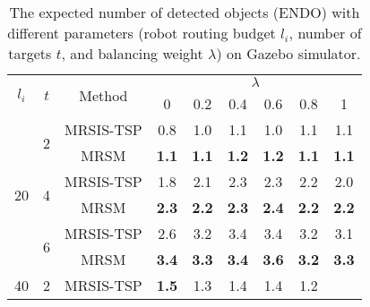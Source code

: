 \begin{table}[]
\centering
\caption{The expected number of detected objects (ENDO) with different parameters (robot routing budget $l_i$, number of targets $t$, and balancing weight $\lambda$) on Gazebo simulator.}
\label{tab:ANDO-lambda}
\begin{tabular}{|c|c|c|cccccc|}
\hline
\multirow{2}{*}{$l_i$} &
  \multirow{2}{*}{$t$} &
  \multirow{2}{*}{Method} &
  \multicolumn{6}{c|}{$\lambda$} \\ \cline{4-9}
 &
   &
   &
  \multicolumn{1}{c|}{0} &
  \multicolumn{1}{c|}{0.2} &
  \multicolumn{1}{c|}{0.4} &
  \multicolumn{1}{c|}{0.6} &
  \multicolumn{1}{c|}{0.8} &
  1 \\ \hline\hline
\multirow{6}{*}{20} &
  \multirow{2}{*}{2} &
  MRSIS-TSP\cite{li2024mrsis} &
  \multicolumn{1}{c|}{0.8} &
  \multicolumn{1}{c|}{1.0} &
  \multicolumn{1}{c|}{1.1} &
  \multicolumn{1}{c|}{1.0} &
  \multicolumn{1}{c|}{1.1} &
  1.1 \\ \cline{3-9}
 &
   &
  MRSM &
  \multicolumn{1}{c|}{\textbf{1.1}} &
  \multicolumn{1}{c|}{\textbf{1.1}} &
  \multicolumn{1}{c|}{\textbf{1.2}} &
  \multicolumn{1}{c|}{\textbf{1.2}} &
  \multicolumn{1}{c|}{\textbf{1.1}} &
  \textbf{1.1} \\ \cline{2-9}
 &
  \multirow{2}{*}{4} &
  MRSIS-TSP\cite{li2024mrsis} &
  \multicolumn{1}{c|}{1.8} &
  \multicolumn{1}{c|}{2.1} &
  \multicolumn{1}{c|}{2.3} &
  \multicolumn{1}{c|}{2.3} &
  \multicolumn{1}{c|}{2.2} &
  2.0 \\ \cline{3-9}
 &
   &
  MRSM &
  \multicolumn{1}{c|}{\textbf{2.3}} &
  \multicolumn{1}{c|}{\textbf{2.2}} &
  \multicolumn{1}{c|}{\textbf{2.3}} &
  \multicolumn{1}{c|}{\textbf{2.4}} &
  \multicolumn{1}{c|}{\textbf{2.2}} &
  \textbf{2.2} \\ \cline{2-9}
 &
  \multirow{2}{*}{6} &
  MRSIS-TSP\cite{li2024mrsis} &
  \multicolumn{1}{c|}{2.6} &
  \multicolumn{1}{c|}{3.2} &
  \multicolumn{1}{c|}{3.4} &
  \multicolumn{1}{c|}{3.4} &
  \multicolumn{1}{c|}{3.2} &
  3.1 \\ \cline{3-9}
 &
   &
  MRSM &
  \multicolumn{1}{c|}{\textbf{3.4}} &
  \multicolumn{1}{c|}{\textbf{3.3}} &
  \multicolumn{1}{c|}{\textbf{3.4}} &
  \multicolumn{1}{c|}{\textbf{3.6}} &
  \multicolumn{1}{c|}{\textbf{3.2}} &
  \textbf{3.3} \\ \hline\hline
\multirow{6}{*}{40} &
  \multirow{2}{*}{2} &
  MRSIS-TSP\cite{li2024mrsis} &
  \multicolumn{1}{c|}{\textbf{1.5}} &
  \multicolumn{1}{c|}{1.3} &
  \multicolumn{1}{c|}{1.4} &
  \multicolumn{1}{c|}{1.4} &
  \multicolumn{1}{c|}{1.2} &

\end{tabular}
\end{table}
